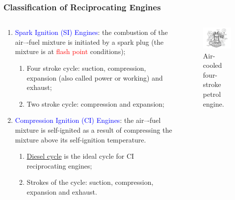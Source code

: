 \documentclass[10pt,compress]{beamer}
\newcommand{\red}{\textcolor{red}}
\newcommand{\blue}{\textcolor{blue}}
\begin{document}
\begin{frame}
 \frametitle{Classification of Reciprocating Engines}
  \begin{columns}
   \begin{column}[c]{0.45\linewidth}\scriptsize
   
     \begin{enumerate}\scriptsize
      \item <2-> \blue{Spark Ignition (SI) Engines}: the combustion of the air–-fuel mixture is initiated by a spark plug (the mixture is at  \red{flash point} conditions);
       \begin{enumerate}\scriptsize
        \item <4-> Four stroke cycle: suction, compression, expansion (also called power or working) and exhaust;
        \item <5-> Two stroke cycle: compression and expansion;
       \end{enumerate}
      \item <3-> \blue{Compression Ignition (CI) Engines}: the air–-fuel mixture is self-ignited as a result of compressing the mixture above its self-ignition temperature.
       \begin{enumerate}\scriptsize
          \item <6-> \underline{Diesel cycle} is the ideal cycle for CI reciprocating engines;
          \item <7-> Strokes of the cycle: suction, compression, expansion and exhaust.
       \end{enumerate}
     \end{enumerate}
   \end{column}
   \begin{column}[c]{0.55\linewidth}
    \begin{figure}%
     \begin{center}
      \includegraphics[width=7.5cm,clip]{./Pics/InternalCombustion_4Strokes}
      \scriptsize\caption{\scriptsize Air-cooled four-stroke petrol engine.}
     \end{center}
    \end{figure}  
   \end{column}  
  \end{columns}
\end{frame}
\end{document}
